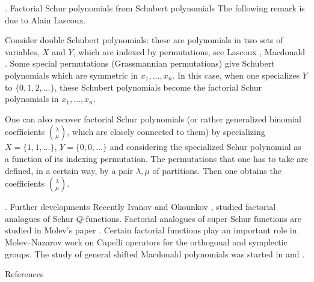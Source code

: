 . Factorial Schur polynomials from Schubert polynomials 
\endsubhead The following remark is due to Alain Lascoux.

Consider double Schubert polynomials: these are polynomials 
in two sets of variables, $X$ and $Y$, which are indexed by permutations,
see Lascoux \cite{Lasc}, Macdonald 
\cite{M5}. Some special permutations (Grassmannian
permutations) give Schubert polynomials which are symmetric in 
$x_1,\ldots,x_n$. In this case, when one specializes $Y$ to
$\{0,1,2,\ldots\}$, these Schubert polynomials become the factorial Schur
polynomials in $x_1,\ldots,x_n$.

One can also recover factorial Schur polynomials 
(or rather generalized binomial coefficients $\binom{\lambda}{\mu}$, which are
closely connected to them) by specializing $X=\{1,1,\ldots\}$,
$Y=\{0,0,\ldots\}$ and considering the specialized Schur polynomial as a
function of its indexing permutation. The permutations that one has to take are
defined, in a certain way,  by a pair $\lambda,\mu$ of partitions. Then one
obtains the coefficients $\binom{\lambda}{\mu}$.

. Further developments \endsubhead 
Recently Ivanov and Okounkov \cite{Iv}, \cite{IO} 
studied factorial 
analogues of Schur $Q$-functions. Factorial analogues of super Schur
functions are studied in Molev's paper \cite{Mo}. Certain factorial
functions play an important role in Molev--Nazarov work \cite{MN} on
Capelli operators for the orthogonal and symplectic groups. 
The study of general shifted Macdonald polynomials was started in
\cite{KnS,Kn,Sa2} and \cite{Ok3}. 


\head References \endhead

